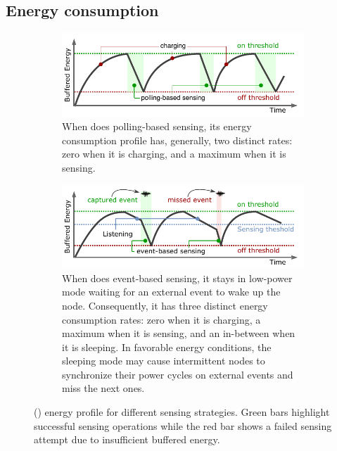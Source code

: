 \subsection{Energy consumption}
\begin{figure}[t]
	\centering
		\begin{subfigure}{\columnwidth}
			\includegraphics[width=\columnwidth]{figures/PowerCycleIntermittentSystem}
			\caption{When \sys does polling-based sensing, its energy consumption profile has, generally, two distinct rates: zero when it is charging, and a maximum when it is sensing.}
			\label{fig:pollingBasedSensing}
	\end{subfigure}
	\begin{subfigure}{\columnwidth}
		\includegraphics[width=\columnwidth]{figures/PowerCycleIntermittentSensor}
		\caption{When \sys does event-based sensing, it stays in low-power mode waiting for an external event to wake up the node. Consequently,  it has three distinct energy consumption rates: zero when it is charging, a maximum when it is sensing, and an in-between when it is sleeping. In favorable energy conditions, the sleeping mode may cause intermittent nodes to synchronize their power cycles on external events and miss the next ones.}
		\label{fig:eventBasedSensing}
\end{subfigure}
		\caption{\fullsys (\sys) energy profile for different sensing strategies. Green bars highlight successful sensing operations  while the red bar shows a failed sensing attempt due to insufficient buffered energy.}
		\label{fig:cisPwrCycle}
\end{figure} 
